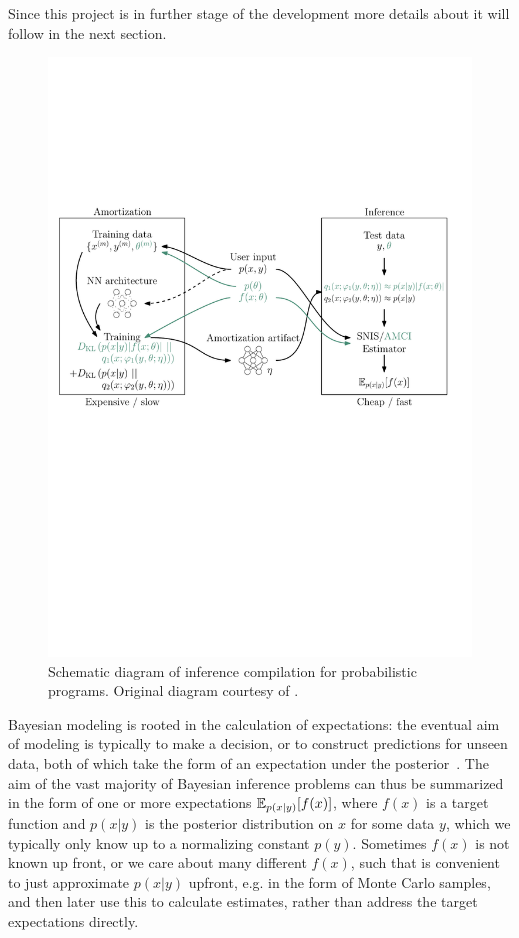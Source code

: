 \documentclass[12pt]{article}
\begin{document}
Since this project is in further stage of the development more details about it will follow in the next section.

\begin{figure}[t]
  \centering
  \includegraphics[width=\linewidth]{figures/diagram.pdf}
  \caption{
  Schematic diagram of inference compilation for probabilistic programs. 
  Original diagram courtesy of \citet{LeEtAl2016}.}
  \label{fig:inf-amortization}
\end{figure}

Bayesian modeling is rooted in the calculation of expectations:
the eventual aim of modeling is typically to make a decision, or to construct
predictions for unseen data, both of which take the form of an expectation under
the posterior~\citep{robert2007bayesian}.  The aim of the vast majority
of Bayesian inference problems can thus be summarized in the form of one or more
expectations $\mathbb{E}_{p(x|y)}\! \left[f(x)\right]$, where $f(x)$ is a target function and
$p(x|y)$ is the posterior distribution on $x$ for some data $y$, 
which we typically only know up to a normalizing constant $p(y)$.  Sometimes $f(x)$
is not known up front, or we care about many different $f(x)$, such
that is convenient to just approximate $p(x|y)$ upfront, e.g. in the form of 
Monte Carlo samples, and then later use this to calculate estimates, rather than
address the target expectations directly.
\end{document}
